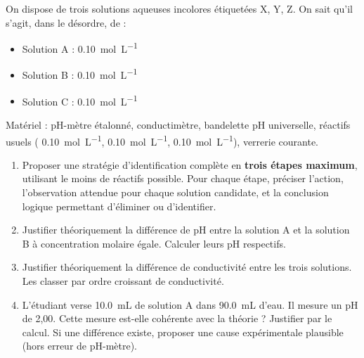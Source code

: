 \documentclass[11pt]{article}
\begin{document}
\begin{exercice}
On dispose de trois solutions aqueuses incolores étiquetées X, Y, Z. On sait qu'il s'agit, dans le désordre, de : 
\begin{itemize}
    \item Solution A :  \SI{0,10}{mol.L^{-1}}
    \item Solution B :  \SI{0,10}{mol.L^{-1}}
    \item Solution C :  \SI{0,10}{mol.L^{-1}}
\end{itemize}
Matériel : pH-mètre étalonné, conductimètre, bandelette pH universelle, réactifs usuels ( \SI{0,10}{mol.L^{-1}},  \SI{0,10}{mol.L^{-1}},  \SI{0,10}{mol.L^{-1}}), verrerie courante.
\begin{enumerate}
    \item Proposer une stratégie d'identification complète en \textbf{trois étapes maximum}, utilisant le moins de réactifs possible. Pour chaque étape, préciser l'action, l'observation attendue pour chaque solution candidate, et la conclusion logique permettant d'éliminer ou d'identifier.
    \item Justifier théoriquement la différence de pH entre la solution A et la solution B à concentration molaire égale. Calculer leurs pH respectifs.
    \item Justifier théoriquement la différence de conductivité entre les trois solutions. Les classer par ordre croissant de conductivité.
    \item L'étudiant verse \SI{10,0}{mL} de solution A dans \SI{90,0}{mL} d'eau. Il mesure un pH de 2,00. Cette mesure est-elle cohérente avec la théorie ? Justifier par le calcul. Si une différence existe, proposer une cause expérimentale plausible (hors erreur de pH-mètre).
\end{enumerate}
\end{exercice}
\end{document}
